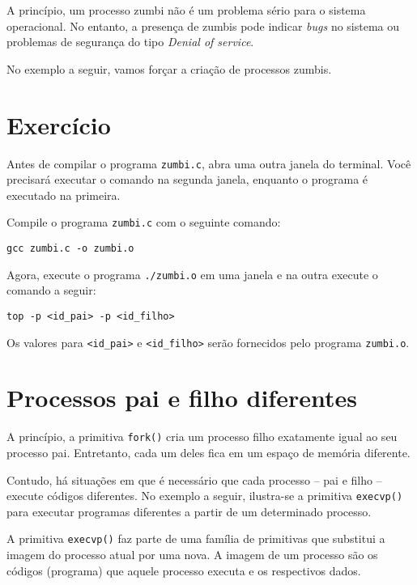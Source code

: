 A princípio, um processo zumbi não é um problema sério para o sistema operacional. No entanto, a presença de zumbis pode indicar \textit{bugs} no sistema ou problemas de segurança do tipo \textit{Denial of service}.

No exemplo a seguir, vamos forçar a criação de processos zumbis.



\section{Exercício}
Antes de compilar o programa \texttt{zumbi.c}, abra uma outra janela do terminal. Você precisará executar o comando  na segunda janela, enquanto o programa é executado na primeira.

Compile o programa \texttt{zumbi.c} com o seguinte comando:

\begin{lstlisting}[style=MyBashStyle]
gcc zumbi.c -o zumbi.o
\end{lstlisting}

Agora, execute o programa \texttt{./zumbi.o} em uma janela e na outra execute o comando a seguir:

\begin{lstlisting}[style=MyBashStyle]
top -p <id_pai> -p <id_filho>
\end{lstlisting}

Os valores para \texttt{<id\_pai>} e \texttt{<id\_filho>} serão fornecidos pelo programa \texttt{zumbi.o}.

\section{Processos pai e filho diferentes}
A princípio, a primitiva \texttt{fork()} cria um processo filho exatamente igual ao seu processo pai. Entretanto, cada um deles fica em um espaço de memória diferente.

Contudo, há situações em que é necessário que cada processo -- pai e filho -- execute códigos diferentes. No exemplo a seguir, ilustra-se a primitiva \texttt{execvp()} para executar programas diferentes a partir de um determinado processo. 

A primitiva \texttt{execvp()} faz parte de uma família de primitivas que substitui a imagem do processo atual por uma nova. A imagem de um processo são os códigos (programa) que aquele processo executa e os respectivos dados.

